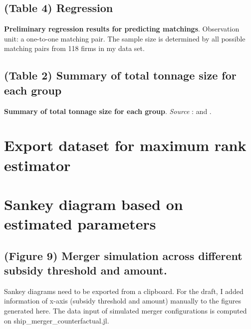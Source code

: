 \documentclass[
  10pt,
]{article}
\begin{document}
\hypertarget{table-4-regression}{%
\subsection{(Table 4) Regression}\label{table-4-regression}}

\begin{table}[!ht]
\scriptsize
\caption{\textbf{Preliminary regression results for predicting matchings}. Observation unit: a one-to-one matching pair. The sample size is determined by all possible matching pairs from 118 firms in my data set. }
\begin{center}

\end{center}
\label{tb:regression_matching}
\end{table}

\hypertarget{table-2-summary-of-total-tonnage-size-for-each-group}{%
\subsection{(Table 2) Summary of total tonnage size for each
group}\label{table-2-summary-of-total-tonnage-size-for-each-group}}

\begin{table}[!ht]
\scriptsize
\caption{\textbf{Summary of total tonnage size for each group}. \textit{Source} : \cite{listgaikou} and \cite{nostalgic}.}
\begin{center}

\end{center}
\label{tb:total_tonnage_size_group_table}
\end{table}

\hypertarget{export-dataset-for-maximum-rank-estimator}{%
\section{Export dataset for maximum rank
estimator}\label{export-dataset-for-maximum-rank-estimator}}

\hypertarget{sankey-diagram-based-on-estimated-parameters}{%
\section{Sankey diagram based on estimated
parameters}\label{sankey-diagram-based-on-estimated-parameters}}

\hypertarget{figure-9-merger-simulation-across-different-subsidy-threshold-and-amount.}{%
\subsection{(Figure 9) Merger simulation across different subsidy
threshold and
amount.}\label{figure-9-merger-simulation-across-different-subsidy-threshold-and-amount.}}

Sankey diagrams need to be exported from a clipboard. For the draft, I
added information of x-axis (subsidy threshold and amount) manually to
the figures generated here. The data input of simulated merger
configurations is computed on ship\_merger\_counterfactual.jl.
\end{document}
